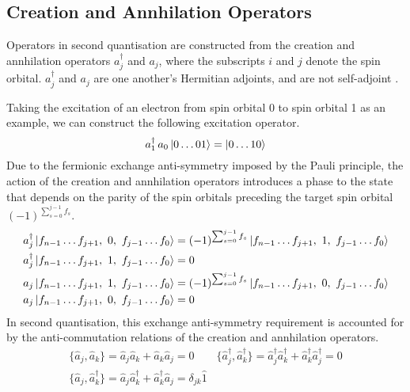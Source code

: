 \subsection{Creation and Annhilation Operators}
Operators in second quantisation are constructed from the creation and annhilation operators $a_j^\dagger$ and $a_j$, where the subscripts $i$ and $j$ denote the spin orbital. $a_j^\dagger$ and $a_j$ are one another's Hermitian adjoints, and are not self-adjoint \cite{Helgaker2000}.

Taking the excitation of an electron from spin orbital 0 to spin orbital 1 as an example, we can construct the following excitation operator.
\begin{equation*}
    a_1^\dagger \, a_0 \ket{0 \dots 01} = \ket{0 \dots 10}
\end{equation*}
Due to the fermionic exchange anti-symmetry imposed by the Pauli principle, the action of the creation and annhilation operators introduces a phase to the state that depends on the parity of the spin orbitals preceding the target spin orbital $(-1)^{\sum_{s=0}^{j-1} f_s}$.
\begin{align*}
    a_j^\dagger \ket{f_{n-1} \dots
    f_{j+1},\,\, 0,\,\, f_{j-1} \dots f_0} &=
    (-1)^{\sum_{s=0}^{j-1} f_s}
    \ket{f_{n-1} \dots f_{j+1},\,\, 1,\,\, f_{j-1} \dots f_0} \\
    a_j^\dagger \ket{f_{n-1} \dots f_{j+1},\,\, 1,\,\, f_{j-1}
    \dots f_0} &= 0 \\
    a_j \ket{f_{n-1} \dots f_{j+1},\,\, 1,\,\, f_{j-1} \dots f_0} &=
    (-1)^{\sum_{s=0}^{j-1} f_s}
    \ket{f_{n-1} \dots f_{j+1},\,\, 0,\,\, f_{j-1} \dots f_0} \\
    a_j \ket{f_{n-1} \dots f_{j+1},\,\, 0,\,\, f_{j-1} \dots f_0} &= 0
\end{align*}
In second quantisation, this exchange anti-symmetry requirement is accounted for by the anti-commutation relations of the creation and annhilation operators.
\begin{equation*}
\begin{gathered}
    \{ \hat a_{j}, \hat a_{k} \} =
    \hat a_{j} \hat a_{k} + \hat a_{k} \hat a_{j} = 0 \qquad
    \{ \hat a_{j}^{\dagger}, \hat a_{k}^{\dagger} \} =
    \hat a_{j}^\dagger \hat a_{k}^\dagger + \hat a_{k}^\dagger \hat a_{j}^\dagger = 0 \\
    \{ \hat a_{j}, \hat a_{k}^{\dagger} \} = \hat a_{j} \hat a_{k}^\dagger + \hat a_{k}^\dagger \hat a_{j} = \delta_{jk} \hat{1}
\end{gathered}
\end{equation*}

